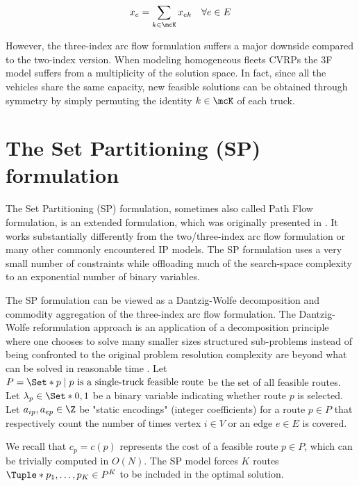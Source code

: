 \begin{equation}
	x_e = \sum_{k \in \mcK} x_{ek} \quad \forall e \in E
\end{equation}

However, the three-index arc flow formulation suffers a major downside compared to the two-index version.
When modeling homogeneous fleets CVRPs the 3F model suffers from a multiplicity of the solution space.
In fact, since all the vehicles share the same capacity,
new feasible solutions can be obtained through symmetry by simply permuting the identity $k \in \mcK$ of each truck.

\section{The Set Partitioning (SP) formulation}
\label{sec:set-partitionining-formulation}

The Set Partitioning (SP) formulation,
sometimes also called Path Flow formulation,
is an extended formulation, which was originally presented in \textcite{balinski1964}.
It works substantially differently from the two/three-index arc flow formulation
or many other commonly encountered IP models.
The SP formulation uses a very small number of constraints
while offloading much of the search-space complexity to an exponential number of binary variables.

The SP formulation can be viewed as a Dantzig-Wolfe decomposition \parencite{dantzig1960}
and commodity aggregation \parencite{desaulniers1998}
of the three-index arc flow formulation.
The Dantzig-Wolfe reformulation approach is an application of a
decomposition principle where one chooses to solve many smaller sizes
structured sub-problems instead of being confronted to
the original problem resolution complexity are beyond what can be
solved in reasonable time \parencite{vanderbeck2005}.
Let $P = \Set*{p \mid p\ \text{is a single-truck feasible route}}$ be the set of all feasible routes.
Let $\lambda_p \in \Set*{0, 1}$ be a binary variable indicating whether route $p$ is selected.
Let $a_{ip}, a_{ep} \in \Z$ be "static encodings" (integer coefficients)
for a route $p \in P$ that respectively count
the number of times vertex $i \in V$ or an edge $e \in E$ is covered.

We recall that $c_p = c(p)$ represents the cost of a feasible route $p \in P$,
which can be trivially computed in $O(N)$.
The SP model forces $K$ routes $\Tuple*{p_1, \dots, p_K} \in P^K$ to be included in the optimal solution.

